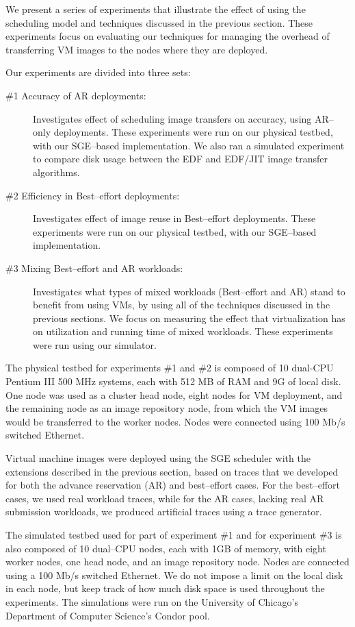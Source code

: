 We present a series of experiments that illustrate the effect of using
the scheduling model and techniques discussed in the previous section.
These experiments focus on evaluating our techniques for managing the
overhead of transferring VM images to the nodes where they are
deployed.

Our experiments are divided into three sets:

\begin{description}
\item[\#1 Accuracy of AR deployments:] Investigates effect of scheduling image transfers on accuracy, using AR--only deployments. These experiments were run on our physical testbed, with our SGE--based implementation. We also ran a simulated experiment to compare disk usage between the EDF and EDF/JIT image transfer algorithms.
\item[\#2 Efficiency in Best--effort deployments:] Investigates effect of image reuse in Best--effort deployments. These experiments were run on our physical testbed, with our SGE--based implementation.
\item[\#3 Mixing Best--effort and AR workloads:] Investigates what types of mixed workloads (Best--effort and AR) stand to benefit from using VMs, by using all of the techniques discussed in the previous sections. We focus on measuring the effect that virtualization has on utilization and running time of mixed workloads. These experiments were run using our simulator.
\end{description}

The physical testbed for experiments \#1 and \#2 is composed of 10 dual{}-CPU Pentium
III 500 MHz systems, each with 512 MB of RAM and 9G of local disk. One
node was used as a cluster head node, eight nodes for VM deployment,
and the remaining node as an image repository node, from which the VM
images would be transferred to the worker nodes. Nodes were connected
using 100 Mb/s switched Ethernet.

Virtual machine images were deployed using the SGE scheduler with the
extensions described in the previous section, based on traces that we developed for both
the advance reservation (AR) and best--effort cases. For the best--effort
cases, we used real workload traces, while for the AR cases, lacking
real AR submission workloads, we produced artificial traces using a
trace generator.

The simulated testbed used for part of experiment \#1 and for experiment \#3 is also composed of 10 dual{}--CPU nodes, each with 1GB of memory, with eight worker nodes, one head node, and an image repository node. Nodes are connected using a 100 Mb/s switched Ethernet. We do not impose a limit on the local disk in each node, but keep track of how much disk space is used throughout the experiments. The simulations were run on the University of Chicago's Department of Computer Science's Condor pool.

